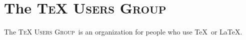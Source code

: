 \documentclass{article}
\newcommand{\TUG}{\textsc{TeX Users Group}}
\begin{document}
\section{The \TUG}
The \TUG\ is an organization for people who use
\TeX\ or \LaTeX.
\end{document}
